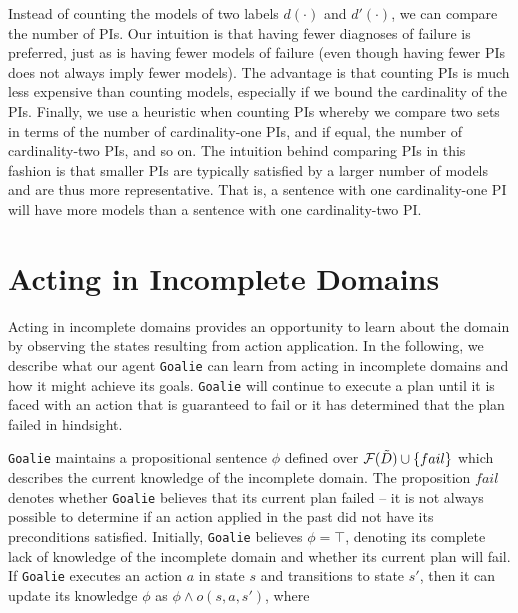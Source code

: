 \documentclass{article}
\newenvironment{packed_itemize}{
\begin{itemize}
  \setlength{\itemsep}{1pt}
  \setlength{\parskip}{0pt}
  \setlength{\parsep}{0pt}
}{\end{itemize}}
\def\goalie{{\tt Goalie}}
\begin{document}
Instead of counting the models of two labels $d(\cdot)$ and $d'(\cdot)$, we can compare the number of PIs.  Our intuition is that having fewer diagnoses of failure is preferred, just as is having fewer models of failure (even though having fewer PIs does not always imply fewer models).  The advantage is that counting PIs is much less expensive than counting models, especially if we bound the cardinality of the PIs.  Finally, we use a heuristic when counting PIs whereby we compare two sets in terms of the number of cardinality-one PIs, and if equal, the number of cardinality-two PIs, and so on.  The intuition behind comparing PIs in this fashion is that smaller PIs are typically satisfied by a larger number of models and are thus more representative.  That is, a sentence with one cardinality-one PI will have more models than a sentence with one cardinality-two PI.

\section{Acting in Incomplete Domains} Acting in incomplete domains provides an opportunity to learn about the domain by observing the states resulting from action application.  In the following, we describe what our agent \goalie{} can learn from acting in incomplete domains and how it might achieve its goals.  
\goalie{} will continue to execute a plan until it is faced with an action that is guaranteed to fail or it has determined that the plan failed in hindsight.



\goalie{} maintains a propositional sentence $\phi$ defined over ${\cal F}(\tilde{D}) \cup \{fail\}$ which describes the current knowledge of the incomplete domain.  The proposition $fail$ denotes whether \goalie{} believes that its current plan failed -- it is not always possible to determine if an action applied in the past did not have its preconditions satisfied.  Initially, \goalie{} believes $\phi = \top$, denoting its complete lack of knowledge of the incomplete domain and whether its current plan will fail.    If \goalie{} executes an action $a$ in state $s$ and transitions to state $s'$, then it can update its knowledge $\phi$ as $\phi \wedge o(s, a, s')$, where 
\end{document}
